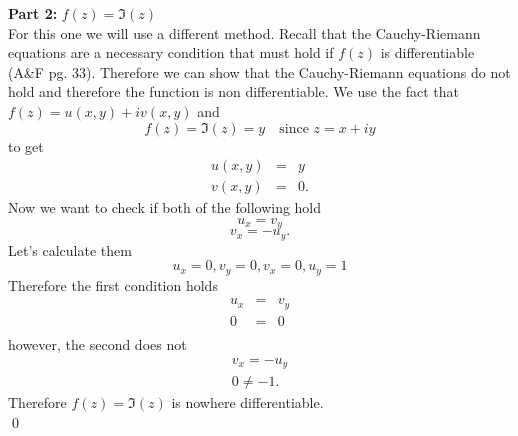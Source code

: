 \documentclass[10pt]{amsart}
\theoremstyle{nonumberplain}
\begin{document}
\begin{enumerate}[label={\bf {\arabic*}:}]
\noindent
\textbf{Part 2:} $f(z) = \Im(z)$ \\
For this one we will use a different method. Recall that the Cauchy-Riemann equations are a necessary condition that must hold if $f(z)$ is differentiable (A\&F pg. 33). Therefore we can show that the Cauchy-Riemann equations do not hold and therefore the function is non differentiable. We use the fact that $f(z) = u(x, y) + i v(x, y)$ and 
$$f(z) = \Im(z) = y \quad\text{since $z = x +iy$}$$
to get 
\begin{eqnarray*}
u(x, y) &=& y \\
v(x, y) &=& 0.
\end{eqnarray*}
Now we want to check if both of the following hold
$$u_x = v_y$$
$$v_x = - u_y.$$
Let's calculate them
$$u_x = 0, v_y = 0, v_x = 0, u_y = 1$$
Therefore the first condition holds
\begin{eqnarray*}
u_x &=& v_y \\
0 &=& 0 \\
\end{eqnarray*}
however, the second does not
\begin{eqnarray*}
v_x = - u_y \\
0 \neq - 1.
\end{eqnarray*}
Therefore $f(z) = \Im(z)$ is nowhere differentiable. \\
\qed


\end{enumerate}
\end{document}

